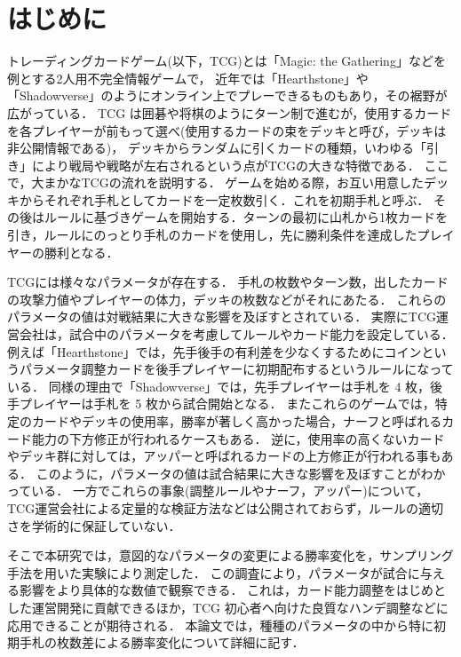 \documentclass[twocolumn]{ltjsarticle}
\begin{document}
\section{はじめに}
\small{
  トレーディングカードゲーム(以下，TCG)とは「Magic: the Gathering」などを例とする2人用不完全情報ゲームで，
  近年では「Hearthstone」や「Shadowverse」のようにオンライン上でプレーできるものもあり，その裾野が広がっている．%
  TCG は囲碁や将棋のようにターン制で進むが，使用するカードを各プレイヤーが前もって選べ(使用するカードの束をデッキと呼び，デッキは非公開情報である)，
  デッキからランダムに引くカードの種類，いわゆる「引き」により戦局や戦略が左右されるという点がTCGの大きな特徴である．
  ここで，大まかなTCGの流れを説明する．%
  ゲームを始める際，お互い用意したデッキからそれぞれ手札としてカードを一定枚数引く．これを初期手札と呼ぶ．
  その後はルールに基づきゲームを開始する．ターンの最初に山札から1枚カードを引き，ルールにのっとり手札のカードを使用し，先に勝利条件を達成したプレイヤーの勝利となる．

  TCGには様々なパラメータが存在する．
  手札の枚数やターン数，出したカードの攻撃力値やプレイヤーの体力，デッキの枚数などがそれにあたる．
  これらのパラメータの値は対戦結果に大きな影響を及ぼすとされている．
  実際にTCG運営会社は，試合中のパラメータを考慮してルールやカード能力を設定している．%
  例えば「Hearthstone」では，先手後手の有利差を少なくするためにコインというパラメータ調整カードを後手プレイヤーに初期配布するというルールになっている．
  同様の理由で「Shadowverse」では，先手プレイヤーは手札を 4 枚，後手プレイヤーは手札を 5 枚から試合開始となる．
  またこれらのゲームでは，特定のカードやデッキの使用率，勝率が著しく高かった場合，ナーフと呼ばれるカード能力の下方修正が行われるケースもある．
  逆に，使用率の高くないカードやデッキ群に対しては，アッパーと呼ばれるカードの上方修正が行われる事もある．%
  このように，パラメータの値は試合結果に大きな影響を及ぼすことがわかっている．
  一方でこれらの事象(調整ルールやナーフ，アッパー)について，TCG運営会社による定量的な検証方法などは公開されておらず，ルールの適切さを学術的に保証していない．

  そこで本研究では，意図的なパラメータの変更による勝率変化を，サンプリング手法を用いた実験により測定した．%
  この調査により，パラメータが試合に与える影響をより具体的な数値で観察できる．%
  これは，カード能力調整をはじめとした運営開発に貢献できるほか，TCG 初心者へ向けた良質なハンデ調整などに応用できることが期待される．
  本論文では，種種のパラメータの中から特に初期手札の枚数差による勝率変化について詳細に記す．
}
\end{document}
